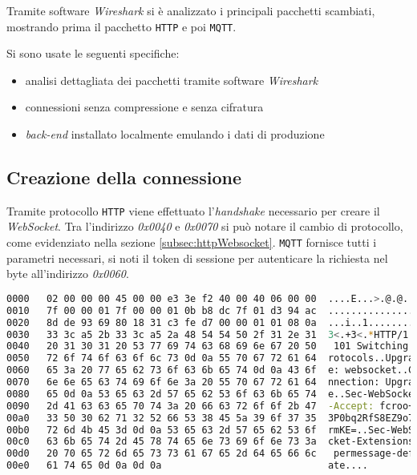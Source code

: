 Tramite software \textit{Wireshark} si è analizzato i principali pacchetti scambiati, mostrando prima il pacchetto \verb+HTTP+ e poi \verb+MQTT+.

\bigskip
\noindent
Si sono usate le seguenti specifiche:
\begin{itemize}
\item analisi dettagliata dei pacchetti tramite software \textit{Wireshark}
\item connessioni senza compressione e senza cifratura
\item \textit{back-end} installato localmente emulando i dati di produzione
\end{itemize}

\subsection{Creazione della connessione}
\label{sub:packetCreazione}

Tramite protocollo \verb+HTTP+ viene effettuato l'\textit{handshake} necessario per creare il \textit{WebSocket}.
Tra l'indirizzo \textit{0x0040} e \textit{0x0070} si può notare il cambio di protocollo, come evidenziato nella sezione \ref{subsec:httpWebsocket}.
\verb+MQTT+ fornisce tutti i parametri necessari, si noti il token di sessione per autenticare la richiesta nel byte all'indirizzo \textit{0x0060}.

\begin{lstlisting}[language=bash, label={lst:packetCreazioneHttp}, captionpos=b, caption={HTTP Upgrade Request per creare il socket WS}, basicstyle=\scriptsize\ttfamily]
0000   02 00 00 00 45 00 00 e3 3e f2 40 00 40 06 00 00  ....E...>.@.@...
0010   7f 00 00 01 7f 00 00 01 0b b8 dc 7f 01 d3 94 ac  ................
0020   8d de 93 69 80 18 31 c3 fe d7 00 00 01 01 08 0a  ...i..1.........
0030   33 3c a5 2b 33 3c a5 2a 48 54 54 50 2f 31 2e 31  3<.+3<.*HTTP/1.1
0040   20 31 30 31 20 53 77 69 74 63 68 69 6e 67 20 50   101 Switching P
0050   72 6f 74 6f 63 6f 6c 73 0d 0a 55 70 67 72 61 64  rotocols..Upgrad
0060   65 3a 20 77 65 62 73 6f 63 6b 65 74 0d 0a 43 6f  e: websocket..Co
0070   6e 6e 65 63 74 69 6f 6e 3a 20 55 70 67 72 61 64  nnection: Upgrad
0080   65 0d 0a 53 65 63 2d 57 65 62 53 6f 63 6b 65 74  e..Sec-WebSocket
0090   2d 41 63 63 65 70 74 3a 20 66 63 72 6f 6f 2b 47  -Accept: fcroo+G
00a0   33 50 30 62 71 32 52 66 53 38 45 5a 39 6f 37 35  3P0bq2RfS8EZ9o75
00b0   72 6d 4b 45 3d 0d 0a 53 65 63 2d 57 65 62 53 6f  rmKE=..Sec-WebSo
00c0   63 6b 65 74 2d 45 78 74 65 6e 73 69 6f 6e 73 3a  cket-Extensions:
00d0   20 70 65 72 6d 65 73 73 61 67 65 2d 64 65 66 6c   permessage-defl
00e0   61 74 65 0d 0a 0d 0a                             ate....
\end{lstlisting}

